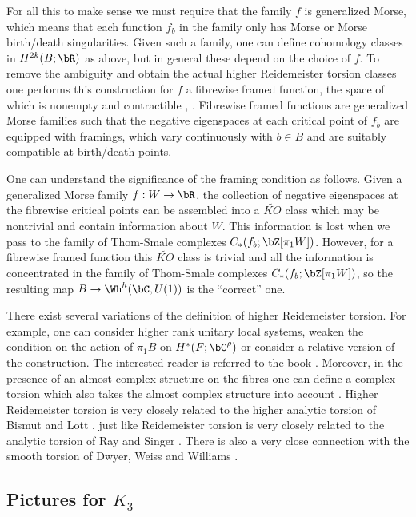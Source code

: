 For all this to make sense we must require that the family $f$ is generalized Morse, which means that each function $f_b$ in the family only has Morse or Morse birth/death singularities. Given such a family, one can define cohomology classes in $H^{2k}(B;\bR)$ as above, but in general these depend on the choice of $f$. To remove the ambiguity and obtain the actual higher Reidemeister torsion classes one performs this construction for $f$ a fibrewise framed function, the space of which is nonempty and contractible \cite{I87}, \cite{EM12}. Fibrewise framed functions are generalized Morse families such that the negative eigenspaces at each critical point of $f_b$ are equipped with framings, which vary continuously with $b \in B$ and are suitably compatible at birth/death points.

One can understand the significance of the framing condition as follows. Given a generalized Morse family $f:W \to \bR$, the collection of negative eigenspaces at the fibrewise critical points can be assembled into a $\widetilde{KO}$ class which may be nontrivial and contain information about $W$. This information is lost when we pass to the family of Thom-Smale complexes $C_*(f_b;\bZ[\pi_1W])$. However, for a fibrewise framed function this $\widetilde{KO}$ class is trivial and all the information is concentrated in the family of Thom-Smale complexes $C_*(f_b;\bZ[\pi_1W])$, so the resulting map $B \to \Wh^h(\bC,U(1))$ is the ``correct'' one.

There exist several variations of the definition of higher Reidemeister torsion. For example, one can consider higher rank unitary local systems, weaken the condition on the action of $\pi_1B$ on $H^*(F;\bC^\rho)$ or consider a relative version of the construction. The interested reader is referred to the book \cite{I02}. Moreover, in the presence of an almost complex structure on the fibres one can define a complex torsion which also takes the almost complex structure into account \cite{I05}. Higher Reidemeister torsion is very closely related to the higher analytic torsion of Bismut and Lott \cite{BL95}, just like Reidemeister torsion is very closely related to the analytic torsion of Ray and Singer \cite{RS71}. There is also a very close connection with the smooth torsion of Dwyer, Weiss and Williams \cite{DWW03}.

\subsection{Pictures for $K_3$}\label{pictures for K3}

